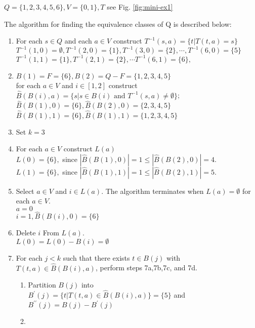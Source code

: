 \begin{example}
	$Q=\{1,2,3,4,5,6\},V=\{0,1\},T $ see Fig. \ref{fig:mini-ex1}
	
	The algorithm for finding the equivalence classes of Q is described below: 
	\begin{enumerate}[Step 1. ]
		\item For each $s\in Q$ and each $a\in V$ construct   $T^{-1}(s,a)=\{t|T(t,a)=s\}$\\
			$T^{-1}(1,0)=\emptyset,T^{-1}(2,0)=\{1\},T^{-1}(3,0)=\{2\},\cdots,T^{-1}(6,0)=\{5\}$\\
			$T^{-1}(1,1)=\{1\},T^{-1}(2,1)=\{2\},\cdots T^{-1}(6,1)=\{6\},$
		\item $B(1)=F=\{6\},B(2)=Q-F=\{1,2,3,4,5\}$\\
			for each $a\in V$ and $i\in[1,2]$ construct  $\hat{B}(B(i),a)=\{s|s\in B(i) \text{ and } T^{-1}(s,a)\ne \emptyset\}$;\\
			$\hat{B}(B(1),0)=\{6\},\hat{B}(B(2),0)=\{2,3,4,5\}$ \\
			$\hat{B}(B(1),1)=\{6\},\hat{B}(B(1),1)=\{1,2,3,4,5\}$ 
		\item Set $k=3$
		\item For each $a\in V$ construct $L(a)$ \\
			$L(0) = \{6\},$ \qquad since $|\hat{B}(B(1),0)|=1\le |\hat{B}(B(2),0)|=4$.\\
			$L(1) = \{6\},$ \qquad since $|\hat{B}(B(1),1)|=1\le |\hat{B}(B(2),1)|=5$.
		\item Select $a\in V$ and $i\in L(a)$. The algorithm terminates when $L(a)=\emptyset$ for each $a\in V$.\\
		    $a=0$\\
		    $i=1,\hat{B}(B(i),0)=\{6\}$
		\item Delete $i$ From $L(a)$.\\
			$L(0)=L(0)-B(i)=\emptyset$
		\item For each $j<k$ such that there exists $t\in B(j)$ with $T(t,a)\in \hat{B}(B(i),a)$, perform steps 7a,7b,7c, and 7d. 
			\begin{enumerate}[Step 7a. ]
				\item Partition $B(j)$ into\\ 
					$B^\prime(j)=\{t|T(t,a)\in \hat{B}(B(i),a)\}=\{5\}$ and\\			
				    $B^{\prime\prime}(j)=B(j)-B^\prime(j)$\\
				\item
			\end{enumerate}
	\end{enumerate}  
\end{example}

